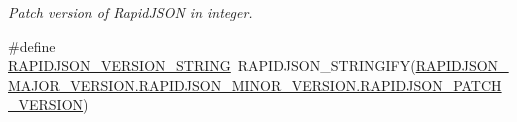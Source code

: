 \begin{DoxyCompactItemize}
\begin{DoxyCompactList}\small\item\em Patch version of Rapid\+J\+S\+ON in integer. \end{DoxyCompactList}\item 
\#define \hyperlink{group___r_a_p_i_d_j_s_o_n___c_o_n_f_i_g_gad283cfde97d9a32b7d8e8107b11f70a6}{R\+A\+P\+I\+D\+J\+S\+O\+N\+\_\+\+V\+E\+R\+S\+I\+O\+N\+\_\+\+S\+T\+R\+I\+NG}~R\+A\+P\+I\+D\+J\+S\+O\+N\+\_\+\+S\+T\+R\+I\+N\+G\+I\+FY(\hyperlink{group___r_a_p_i_d_j_s_o_n___c_o_n_f_i_g_gaf967d31be43666ce7f53756d73bd1cdf}{R\+A\+P\+I\+D\+J\+S\+O\+N\+\_\+\+M\+A\+J\+O\+R\+\_\+\+V\+E\+R\+S\+I\+O\+N.\+R\+A\+P\+I\+D\+J\+S\+O\+N\+\_\+\+M\+I\+N\+O\+R\+\_\+\+V\+E\+R\+S\+I\+O\+N.\+R\+A\+P\+I\+D\+J\+S\+O\+N\+\_\+\+P\+A\+T\+C\+H\+\_\+\+V\+E\+R\+S\+I\+ON})\hypertarget{group___r_a_p_i_d_j_s_o_n___c_o_n_f_i_g_gad283cfde97d9a32b7d8e8107b11f70a6}{}\label{group___r_a_p_i_d_j_s_o_n___c_o_n_f_i_g_gad283cfde97d9a32b7d8e8107b11f70a6}


\end{DoxyCompactItemize}
